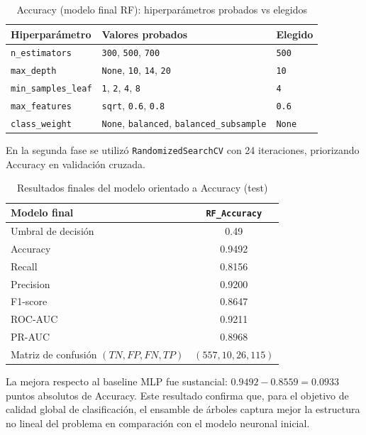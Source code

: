 \begin{table}[h]
\centering
\small
\caption{Accuracy (modelo final RF): hiperparámetros probados vs elegidos}
\label{tab:acc_hparams_rf}
\begin{tabular}{p{}p{}p{}}
\toprule
\textbf{Hiperparámetro} & \textbf{Valores probados} & \textbf{Elegido} \\
\midrule
\texttt{n\_estimators} & \texttt{300}, \texttt{500}, \texttt{700} & \texttt{500} \\
\texttt{max\_depth} & \texttt{None}, \texttt{10}, \texttt{14}, \texttt{20} & \texttt{10} \\
\texttt{min\_samples\_leaf} & \texttt{1}, \texttt{2}, \texttt{4}, \texttt{8} & \texttt{4} \\
\texttt{max\_features} & \texttt{sqrt}, \texttt{0.6}, \texttt{0.8} & \texttt{0.6} \\
\texttt{class\_weight} & \texttt{None}, \texttt{balanced}, \texttt{balanced\_subsample} & \texttt{None} \\
\bottomrule
\end{tabular}
\end{table}

En la segunda fase se utilizó \texttt{RandomizedSearchCV} con 24 iteraciones, priorizando Accuracy en validación cruzada.

\begin{table}[h]
\centering
\caption{Resultados finales del modelo orientado a Accuracy (test)}
\begin{tabular}{|l|c|}
\hline
Modelo final & \texttt{RF\_Accuracy} \\
\hline
Umbral de decisión & 0.49 \\
\hline
Accuracy & 0.9492 \\
\hline
Recall & 0.8156 \\
\hline
Precision & 0.9200 \\
\hline
F1-score & 0.8647 \\
\hline
ROC-AUC & 0.9211 \\
\hline
PR-AUC & 0.8968 \\
\hline
Matriz de confusión $(TN,FP,FN,TP)$ & $(557,10,26,115)$ \\
\hline
\end{tabular}
\end{table}

La mejora respecto al baseline MLP fue sustancial: $0.9492 - 0.8559 = 0.0933$ puntos absolutos de Accuracy. Este resultado confirma que, para el objetivo de calidad global de clasificación, el ensamble de árboles captura mejor la estructura no lineal del problema en comparación con el modelo neuronal inicial.

